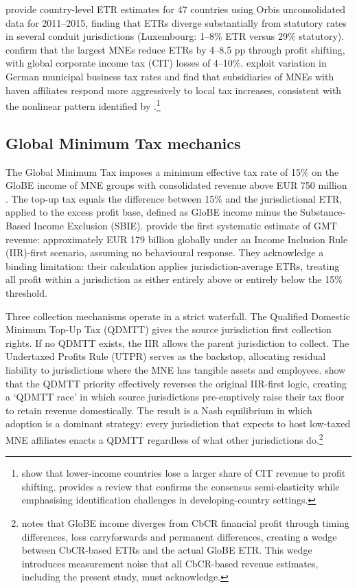 \documentclass[11pt,a4paper]{article}
\begin{document}
\citet{garcia-bernardo2023} provide country-level ETR estimates for 47 countries using Orbis unconsolidated data for 2011--2015, finding that ETRs diverge substantially from statutory rates in several conduit jurisdictions (Luxembourg: 1--8\% ETR versus 29\% statutory). \citet{johansson2017} confirm that the largest MNEs reduce ETRs by 4--8.5 pp through profit shifting, with global corporate income tax (CIT) losses of 4--10\%. \citet{bilicka2026} exploit variation in German municipal business tax rates and find that subsidiaries of MNEs with haven affiliates respond more aggressively to local tax increases, consistent with the nonlinear pattern identified by \citet{dowd2017}.\footnote{\citet{cobham2018} show that lower-income countries lose a larger share of CIT revenue to profit shifting. \citet{riedel2018} provides a review that confirms the consensus semi-elasticity while emphasising identification challenges in developing-country settings.}


\subsection{Global Minimum Tax mechanics}\label{sec:design}

The Global Minimum Tax imposes a minimum effective tax rate of 15\% on the GloBE income of MNE groups with consolidated revenue above EUR 750 million \citep{oecd2025}. The top-up tax equals the difference between 15\% and the jurisdictional ETR, applied to the excess profit base, defined as GloBE income minus the Substance-Based Income Exclusion (SBIE). \citet{barake2022} provide the first systematic estimate of GMT revenue: approximately EUR 179 billion globally under an Income Inclusion Rule (IIR)-first scenario, assuming no behavioural response. They acknowledge a binding limitation: their calculation applies jurisdiction-average ETRs, treating all profit within a jurisdiction as either entirely above or entirely below the 15\% threshold.

Three collection mechanisms operate in a strict waterfall. The Qualified Domestic Minimum Top-Up Tax (QDMTT) gives the source jurisdiction first collection rights. If no QDMTT exists, the IIR allows the parent jurisdiction to collect. The Undertaxed Profits Rule (UTPR) serves as the backstop, allocating residual liability to jurisdictions where the MNE has tangible assets and employees. \citet{devereux2022} show that the QDMTT priority effectively reverses the original IIR-first logic, creating a `QDMTT race' in which source jurisdictions pre-emptively raise their tax floor to retain revenue domestically. The result is a Nash equilibrium in which adoption is a dominant strategy: every jurisdiction that expects to host low-taxed MNE affiliates enacts a QDMTT regardless of what other jurisdictions do.\footnote{\citet{hanlon2023} notes that GloBE income diverges from CbCR financial profit through timing differences, loss carryforwards and permanent differences, creating a wedge between CbCR-based ETRs and the actual GloBE ETR. This wedge introduces measurement noise that all CbCR-based revenue estimates, including the present study, must acknowledge.}
\end{document}
